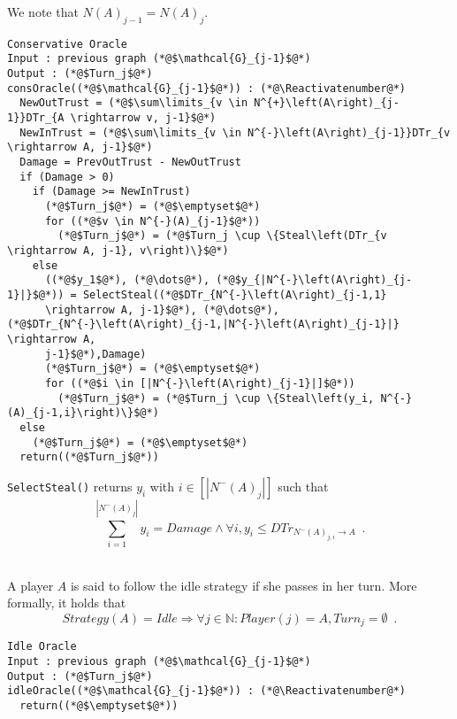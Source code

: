 \documentclass[11pt]{llncs}
\makeatletter
\newcommand*\Suppressnumber{%
  \lst@AddToHook{OnNewLine}{%
    \let\thelstnumber\relax%
     \advance\c@lstnumber-\@ne\relax%
    }%
}
\makeatother
\begin{document}
     We note that $N\left(A\right)_{j-1} = N\left(A\right)_j$. \\
     \Suppressnumber
     \begin{lstlisting}[label=conservativeoracle, style=numbers]
Conservative Oracle
Input : previous graph (*@$\mathcal{G}_{j-1}$@*)
Output : (*@$Turn_j$@*)
consOracle((*@$\mathcal{G}_{j-1}$@*)) : (*@\Reactivatenumber@*)
  NewOutTrust = (*@$\sum\limits_{v \in N^{+}\left(A\right)_{j-1}}DTr_{A \rightarrow v, j-1}$@*)
  NewInTrust = (*@$\sum\limits_{v \in N^{-}\left(A\right)_{j-1}}DTr_{v \rightarrow A, j-1}$@*)
  Damage = PrevOutTrust - NewOutTrust
  if (Damage > 0)
    if (Damage >= NewInTrust)
      (*@$Turn_j$@*) = (*@$\emptyset$@*)
      for ((*@$v \in N^{-}(A)_{j-1}$@*))
        (*@$Turn_j$@*) = (*@$Turn_j \cup \{Steal\left(DTr_{v \rightarrow A, j-1}, v\right)\}$@*)
    else
      ((*@$y_1$@*), (*@\dots@*), (*@$y_{|N^{-}\left(A\right)_{j-1}|}$@*)) = SelectSteal((*@$DTr_{N^{-}\left(A\right)_{j-1,1}
      \rightarrow A, j-1}$@*), (*@\dots@*), (*@$DTr_{N^{-}\left(A\right)_{j-1,|N^{-}\left(A\right)_{j-1}|} \rightarrow A,
      j-1}$@*),Damage)
      (*@$Turn_j$@*) = (*@$\emptyset$@*)
      for ((*@$i \in [|N^{-}\left(A\right)_{j-1}|]$@*))
        (*@$Turn_j$@*) = (*@$Turn_j \cup \{Steal\left(y_i, N^{-}(A)_{j-1,i}\right)\}$@*)
  else
    (*@$Turn_j$@*) = (*@$\emptyset$@*)
  return((*@$Turn_j$@*))
     \end{lstlisting}
     \texttt{SelectSteal()} returns $y_i$ with $i \in [|N^{-}\left(A\right)_j|]$ such that
     \begin{equation}
        \sum\limits_{i=1}^{|N^{-}\left(A\right)_j|}y_i = Damage \wedge \forall i, y_i \leq DTr_{N^{-}\left(A\right)_{j,i}
        \rightarrow A} \enspace.
     \end{equation}
     \begin{definition} \ \\
        A player $A$ is said to follow the idle strategy if she passes in her turn. More formally, it holds that
        \begin{equation}
           Strategy\left(A\right) = Idle \Rightarrow \forall j \in \mathbb{N} : Player\left(j\right) = A, Turn_j = \emptyset
           \enspace.
        \end{equation}
     \end{definition}
     \Suppressnumber
     \begin{lstlisting}[label=idleoracle, style=numbers]
Idle Oracle
Input : previous graph (*@$\mathcal{G}_{j-1}$@*)
Output : (*@$Turn_j$@*)
idleOracle((*@$\mathcal{G}_{j-1}$@*)) : (*@\Reactivatenumber@*)
  return((*@$\emptyset$@*))
     \end{lstlisting}
\end{document}
